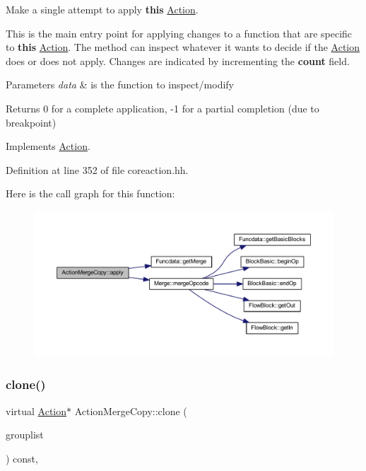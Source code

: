 Make a single attempt to apply {\bfseries{this}} \mbox{\hyperlink{class_action}{Action}}. 

This is the main entry point for applying changes to a function that are specific to {\bfseries{this}} \mbox{\hyperlink{class_action}{Action}}. The method can inspect whatever it wants to decide if the \mbox{\hyperlink{class_action}{Action}} does or does not apply. Changes are indicated by incrementing the {\bfseries{count}} field. 
\begin{DoxyParams}{Parameters}
{\em data} & is the function to inspect/modify \\
\hline
\end{DoxyParams}
\begin{DoxyReturn}{Returns}
0 for a complete application, -\/1 for a partial completion (due to breakpoint) 
\end{DoxyReturn}


Implements \mbox{\hyperlink{class_action_aac1c3999d6c685b15f5d9765a4d04173}{Action}}.



Definition at line 352 of file coreaction.\+hh.

Here is the call graph for this function\+:
\nopagebreak
\begin{figure}[H]
\begin{center}
\leavevmode
\includegraphics[width=350pt]{class_action_merge_copy_a363eedc3ead59931897e73fb55a31a0e_cgraph}
\end{center}
\end{figure}
\mbox{\label{class_action_merge_copy_afb28234f727a499cda6e1531f348cdef}} 
\subsubsection{\texorpdfstring{clone()}{clone()}}
{\footnotesize\ttfamily virtual \mbox{\hyperlink{class_action}{Action}}$\ast$ Action\+Merge\+Copy\+::clone (\begin{DoxyParamCaption}\item[{const \mbox{\hyperlink{class_action_group_list}{Action\+Group\+List}} \&}]{grouplist }\end{DoxyParamCaption}) const\hspace{0.3cm}{\ttfamily [inline]}, {\ttfamily [virtual]}}



